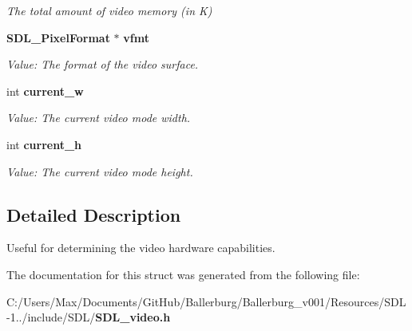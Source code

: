 \begin{DoxyCompactItemize}
\begin{DoxyCompactList}\small\item\em The total amount of video memory (in K) \end{DoxyCompactList}\item 
{\bf S\+D\+L\+\_\+\+Pixel\+Format} $\ast$ {\bf vfmt}\label{struct_s_d_l___video_info_a8501500d288bda9c60d8251138478f08}

\begin{DoxyCompactList}\small\item\em Value\+: The format of the video surface. \end{DoxyCompactList}\item 
int {\bf current\+\_\+w}\label{struct_s_d_l___video_info_add58e29175b54818092e9dea416fdc7f}

\begin{DoxyCompactList}\small\item\em Value\+: The current video mode width. \end{DoxyCompactList}\item 
int {\bf current\+\_\+h}\label{struct_s_d_l___video_info_ae797099dc83c35aa6fa9a157fee4c120}

\begin{DoxyCompactList}\small\item\em Value\+: The current video mode height. \end{DoxyCompactList}\end{DoxyCompactItemize}


\subsection{Detailed Description}
Useful for determining the video hardware capabilities. 

The documentation for this struct was generated from the following file\+:\begin{DoxyCompactItemize}
\item 
C\+:/\+Users/\+Max/\+Documents/\+Git\+Hub/\+Ballerburg/\+Ballerburg\+\_\+v001/\+Resources/\+S\+D\+L-\/1../include/\+S\+D\+L/{\bf S\+D\+L\+\_\+video.\+h}\end{DoxyCompactItemize}
